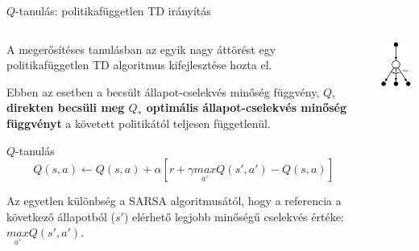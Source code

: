 \documentclass[english, aspectratio=169]{beamer}
\begin{document}
\begin{frame}{$Q$-tanulás: politikafüggetlen TD irányítás}
\begin{columns}
\begin{column}{.75\textwidth}
A megerősítéses tanulásban az egyik nagy áttörést egy politikafüggetlen TD algoritmus kifejlesztése hozta el.\par\smallskip
Ebben az esetben a becsült állapot-cselekvés minőség függvény, $Q$, \textbf{direkten becsüli meg  $Q_*$ optimális állapot-cselekvés minőség függvényt} a követett politikától teljesen függetlenül.
\begin{block}{$Q$-tanulás}
\[
Q(s,a) \leftarrow Q(s,a) + \alpha \left[ r + \gamma \underset{a'}{max}Q(s',a') - Q(s,a) \right]
\]
\end{block}
Az egyetlen különbség a SARSA algoritmusától, hogy a referencia a következő állapotból ($s'$) elérhető legjobb minőségű cselekvés értéke: $\underset{a'}{max}Q(s',a')$.
\end{column}
\begin{column}{.25\textwidth}
\begin{center}
\includegraphics[width=3cm, keepaspectratio]{images/ql_2.png}
\end{center}
\end{column}
\end{columns}
\end{frame}
\end{document}

